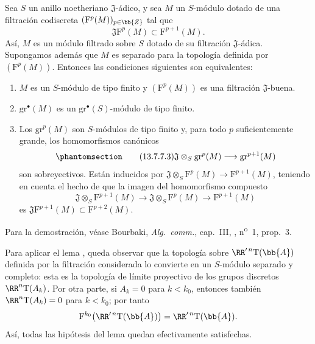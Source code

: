 \documentclass[oneside]{amsart}
\newcommand{\oldpage}[2][]{{\marginnote{\normalfont\textbf{#1}~|~#2}}\ignorespaces}
\let\EGAOriginalLabel\label
\renewcommand{\label}[1]{\phantomsection\EGAOriginalLabel{#1}}
\begin{document}
\begin{lemma}[13.7.7.2]
\label{0.13.7.7.2}
Sea $S$ un anillo noetheriano $\mathfrak{J}$-ádico, y sea $M$
un $S$-módulo dotado de una filtración codiscreta
$(\mathrm{F}^p(M))_{p\in\bb{Z}}$ tal que
\[
  \mathfrak{J}\mathrm{F}^p(M)
  \subset
  \mathrm{F}^{p+1}(M).
\]
Así, $M$ es un módulo filtrado sobre $S$ dotado de su
filtración $\mathfrak{J}$-ádica.
Supongamos además que $M$ es separado para la topología definida por
$(\mathrm{F}^p(M))$.
Entonces las condiciones siguientes son equivalentes:
\begin{enumerate}
  \item[{\rm a)}] $M$ es un $S$-módulo de tipo finito y
  $(\mathrm{F}^p(M))$ es una filtración $\mathfrak{J}$-buena.
  \item[{\rm b)}] $\mathrm{gr}^\bullet(M)$ es un
  $\mathrm{gr}^\bullet(S)$-módulo de tipo finito.
  \item[{\rm c)}] Los $\mathrm{gr}^p(M)$ son $S$-módulos de
  tipo finito y, para todo $p$ suficientemente grande, los homomorfismos
  canónicos
  \begin{equation}
  \label{0.13.7.7.3}
  \tag{13.7.7.3}
    \mathfrak{J}\otimes_S\mathrm{gr}^p(M)
    \longrightarrow
    \mathrm{gr}^{p+1}(M)
  \end{equation}
  \oldpage[0\textsubscript{III}]{79}
  son sobreyectivos.
  Están inducidos por
  $\mathfrak{J}\otimes_S\mathrm{F}^p(M)
  \longrightarrow\mathrm{F}^{p+1}(M)$, teniendo en cuenta el hecho
  de que la imagen del homomorfismo compuesto
  \[
    \mathfrak{J}\otimes_S\mathrm{F}^{p+1}(M)
    \longrightarrow
    \mathfrak{J}\otimes_S\mathrm{F}^p(M)
    \longrightarrow
    \mathrm{F}^{p+1}(M)
  \]
  es
  $\mathfrak{J}\mathrm{F}^{p+1}(M)
  \subset\mathrm{F}^{p+2}(M)$.
\end{enumerate}

\textup{Para la demostración, véase Bourbaki, \emph{Alg.\ comm.}, cap.~III,
, n\textsuperscript{o}~1, prop.~3.}
\end{lemma}

\begin{env}[13.7.7.4]
\label{0.13.7.7.4}
Para aplicar el lema , queda observar que la
topología sobre $\RR'^{\,n}\mathrm{T}(\bb{A})$ definida por la filtración
considerada lo convierte en un $S$-módulo separado y completo:
esta es la topología de límite proyectivo de los grupos discretos
$\RR^n\mathrm{T}(A_k)$.
Por otra parte, si $A_k=0$ para $k<k_0$, entonces también
$\RR^n\mathrm{T}(A_k)=0$ para $k<k_0$; por tanto
\[
  \mathrm{F}^{k_0}\bigl(\RR'^{\,n}\mathrm{T}(\bb{A})\bigr)
  =
  \RR'^{\,n}\mathrm{T}(\bb{A}).
\]
Así, todas las hipótesis del lema quedan efectivamente satisfechas.
\end{env}
\end{document}

